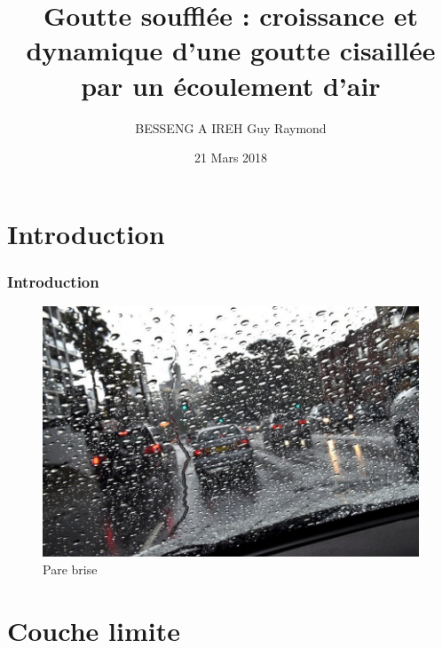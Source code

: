 \documentclass{beamer}
\title[Goutte soufflée]{Goutte soufflée : croissance et dynamique d'une goutte cisaillée par un écoulement d'air\xspace}
\author{BESSENG A IREH Guy Raymond}
\institute[]{Université Paul Sabatier}
\date{21 Mars 2018}
\begin{document}
\maketitle
\section{Introduction}\label{sec:introduction}
\begin{frame}
\frametitle{Introduction}
	\begin{figure}
		\centering
		\includegraphics[width=0.8\linewidth]
	{./image/un-pare-brise-illustration.jpg}
	\caption{Pare brise}
\end{figure}
\end{frame}


\section{Couche limite}\label{sec:couche}
\end{document}
